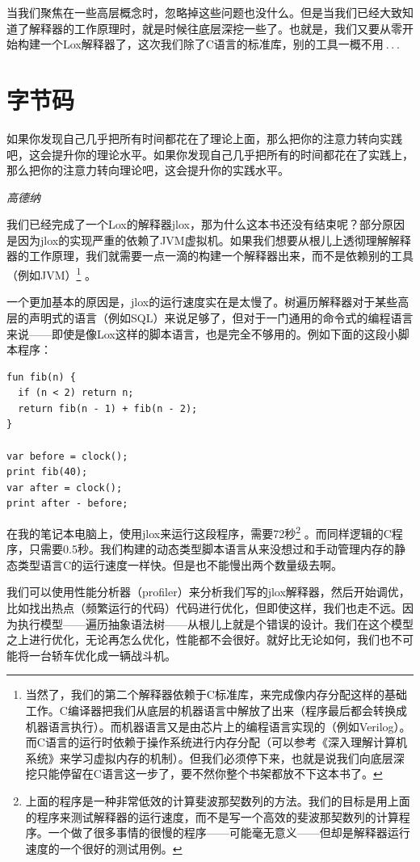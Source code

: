 \documentclass[cn,10pt,math=newtx,citestyle=gb7714-2015,bibstyle=gb7714-2015]{elegantbook}
\begin{document}
当我们聚焦在一些高层概念时，忽略掉这些问题也没什么。但是当我们已经大致知道了解释器的工作原理时，就是时候往底层深挖一些了。也就是，我们又要从零开始构建一个Lox解释器了，这次我们除了C语言的标准库，别的工具一概不用 . . . 

\chapter{字节码}

\epigraph{如果你发现自己几乎把所有时间都花在了理论上面，那么把你的注意力转向实践吧，这会提升你的理论水平。如果你发现自己几乎把所有的时间都花在了实践上，那么把你的注意力转向理论吧，这会提升你的实践水平。}{\textit{高德纳}}

我们已经完成了一个Lox的解释器jlox，那为什么这本书还没有结束呢？部分原因是因为jlox的实现严重的依赖了JVM虚拟机。如果我们想要从根儿上透彻理解解释器的工作原理，我们就需要一点一滴的构建一个解释器出来，而不是依赖别的工具（例如JVM）\footnote{当然了，我们的第二个解释器依赖于C标准库，来完成像内存分配这样的基础工作。C编译器把我们从底层的机器语言中解放了出来（程序最后都会转换成机器语言执行）。而机器语言又是由芯片上的编程语言实现的（例如Verilog）。而C语言的运行时依赖于操作系统进行内存分配（可以参考《深入理解计算机系统》来学习虚拟内存的机制）。但我们必须停下来，也就是说我们向底层深挖只能停留在C语言这一步了，要不然你整个书架都放不下这本书了。} 。 

一个更加基本的原因是，jlox的运行速度实在是太慢了。树遍历解释器对于某些高层的声明式的语言（例如SQL）来说足够了，但对于一门通用的命令式的编程语言来说——即使是像Lox这样的脚本语言，也是完全不够用的。例如下面的这段小脚本程序：

\begin{verbatim}
fun fib(n) {
  if (n < 2) return n;
  return fib(n - 1) + fib(n - 2); 
}

var before = clock();
print fib(40);
var after = clock();
print after - before;
\end{verbatim}

在我的笔记本电脑上，使用jlox来运行这段程序，需要72秒\footnote{上面的程序是一种非常低效的计算斐波那契数列的方法。我们的目标是用上面的程序来测试解释器的运行速度，而不是写一个高效的斐波那契数列的计算程序。一个做了很多事情的很慢的程序——可能毫无意义——但却是解释器运行速度的一个很好的测试用例。} 。而同样逻辑的C程序，只需要0.5秒。我们构建的动态类型脚本语言从来没想过和手动管理内存的静态类型语言C的运行速度一样快。但是也不能慢出两个数量级去啊。

我们可以使用性能分析器（profiler）来分析我们写的jlox解释器，然后开始调优，比如找出热点（频繁运行的代码）代码进行优化，但即使这样，我们也走不远。因为执行模型——遍历抽象语法树——从根儿上就是个错误的设计。我们在这个模型之上进行优化，无论再怎么优化，性能都不会很好。就好比无论如何，我们也不可能将一台轿车优化成一辆战斗机。
\end{document}

